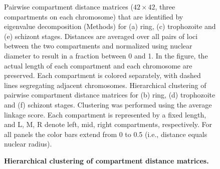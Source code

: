 \documentclass{article}
\begin{document}
\begin{figure}
  \begin{center}
   \hspace{0.04\textwidth}
   \hspace{0.1\textwidth}
   \hspace{0.04\textwidth}
   \hspace{0.1\textwidth}
   \hspace{0.04\textwidth}
  \end{center}
\caption{{\bf Hierarchical clustering of compartment distance matrices. }}
{Pairwise compartment distance matrices ($42\times42$, three compartments on each chromosome) that are identified
    by eigenvalue decomposition (Methods) for (a) ring, (c) trophozoite and (e) schizont stages. Distances are
    averaged over all pairs of loci between the two compartments and normalized using nuclear diameter to result
    in a fraction between 0 and 1. In the figure, the actual length of each compartment and each chromosome are preserved.
    Each compartment is colored separately, with dashed lines segregating adjacent chromosomes.
    Hierarchical clustering of pairwise compartment distance matrices for (b) ring, (d) trophozoite and
    (f) schizont stages. Clustering was performed using the average linkage score.
    Each compartment is represented by a fixed length, and L, M, R denote left, mid, right
    compartments, respectively. For all panels the color bars extend from 0 to 0.5
    (i.e., distance equals nuclear radius).
}
\label{suppfig:compDists}
\end{figure}
\clearpage
\end{document}
